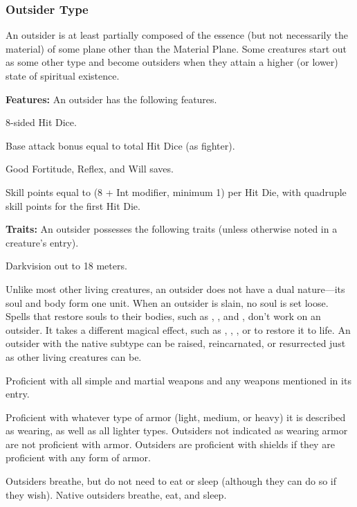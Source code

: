 \subsubsection{Outsider Type}
An outsider is at least partially composed of the essence (but not necessarily the material) of some plane other than the Material Plane. Some creatures start out as some other type and become outsiders when they attain a higher (or lower) state of spiritual existence.

\textbf{Features:} An outsider has the following features.
\begin{itemize*}
\item 8-sided Hit Dice.
\item Base attack bonus equal to total Hit Dice (as fighter).
\item Good Fortitude, Reflex, and Will saves.
\item Skill points equal to (8 + Int modifier, minimum 1) per Hit Die, with quadruple skill points for the first Hit Die.
\end{itemize*}

\textbf{Traits:} An outsider possesses the following traits (unless otherwise noted in a creature's entry).
\begin{itemize*}
\item Darkvision out to 18 meters.
\item Unlike most other living creatures, an outsider does not have a dual nature—its soul and body form one unit. When an outsider is slain, no soul is set loose. Spells that restore souls to their bodies, such as , , and , don't work on an outsider. It takes a different magical effect, such as , , , or  to restore it to life. An outsider with the native subtype can be raised, reincarnated, or resurrected just as other living creatures can be.
\item Proficient with all simple and martial weapons and any weapons mentioned in its entry.
\item Proficient with whatever type of armor (light, medium, or heavy) it is described as wearing, as well as all lighter types. Outsiders not indicated as wearing armor are not proficient with armor. Outsiders are proficient with shields if they are proficient with any form of armor.
\item Outsiders breathe, but do not need to eat or sleep (although they can do so if they wish). Native outsiders breathe, eat, and sleep.
\end{itemize*}

